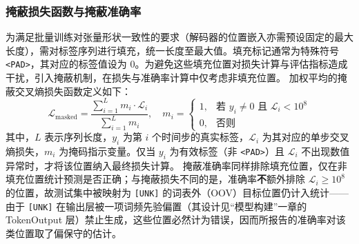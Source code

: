 \subsubsection{掩蔽损失函数与掩蔽准确率}
    为满足批量训练对张量形状一致性的要求（解码器的位置嵌入亦需预设固定的最大长度），需对标签序列进行填充，统一长度至最大值。填充标记通常为特殊符号 \texttt{<PAD>}，其对应的标签值设为 $0$。为避免这些填充位置对损失计算与评估指标造成干扰，引入掩蔽机制，在损失与准确率计算中仅考虑非填充位置。
    加权平均的掩蔽交叉熵损失函数定义如下：
    \begin{equation}
    \mathcal{L}_{\text{masked}} = \frac{\sum_{i=1}^{L} m_i \cdot \mathcal{L}_i}{\sum_{i=1}^{L} m_i}, \quad
    m_i =
    \begin{cases}
    1, & \text{若 } y_i \neq 0 \text{ 且 } \mathcal{L}_i < 10^8 \\
    0, & \text{否则}
    \end{cases}
    \end{equation}
    其中，$L$ 表示序列长度，$y_i$ 为第 $i$ 个时间步的真实标签，$\mathcal{L}_i$ 为其对应的单步交叉熵损失，$m_i$ 为掩码指示变量。仅当 $y_i$ 为有效标签（非 \texttt{<PAD>}）且 $\mathcal{L}_i$ 不出现数值异常时，才将该位置纳入最终损失计算。
    掩蔽准确率同样排除填充位置，仅在非填充位置统计预测是否正确；与掩蔽损失不同的是，准确率\textbf{不}额外排除 $\mathcal{L}_i \ge 10^8$ 的位置，故测试集中被映射为 \texttt{[UNK]} 的词表外（OOV）目标位置仍计入统计——由于 \texttt{[UNK]} 在输出层被一项词频先验偏置（其设计见“模型构建”一章的 TokenOutput 层）禁止生成，这些位置必然计为错误，因而所报告的准确率对该类位置取了偏保守的估计。
